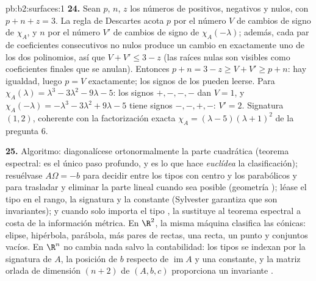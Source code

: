 \begin{solution}{pb:b2:surfaces:1}
\textbf{24.} Sean $p$, $n$, $z$ los números de 
positivos, negativos y nulos, con $p + n + z = 3$. La regla de
Descartes acota $p$ por el número $V$ de cambios de signo de
$\chi_A$, y $n$ por el número $V'$ de cambios de signo de
$\chi_A(-\lambda)$; además, cada par de coeficientes consecutivos no
nulos produce un cambio en exactamente uno de los dos polinomios, así
que $V + V' \leq 3 - z$ (las raíces nulas son visibles como
coeficientes finales que se anulan). Entonces $p + n = 3 - z \geq V +
V' \geq p + n$: hay igualdad, luego $p = V$ exactamente; los signos
de los  pueden leerse. Para $\chi_A(\lambda) =
\lambda^3 - 3\lambda^2 - 9\lambda - 5$: los signos $+,-,-,-$ dan $V =
1$, y $\chi_A(-\lambda) = -\lambda^3 - 3\lambda^2 + 9\lambda - 5$
tiene signos $-,-,+,-$: $V' = 2$. Signatura $(1, 2)$, coherente con
la factorización exacta $\chi_A = (\lambda - 5)(\lambda + 1)^2$ de la
pregunta 6.

\textbf{25.} Algoritmo: diagonalícese ortonormalmente la parte
cuadrática (teorema espectral: es el único paso 
profundo, y es lo que hace \emph{euclídea} la clasificación);
resuélvase $A\Omega = -b$ para decidir entre los tipos con centro y
los parabólicos y para trasladar y eliminar la parte lineal cuando
sea posible (geometría ); léase el tipo en el rango, la
signatura y la constante (Sylvester garantiza que son invariantes);
y cuando solo importa el tipo , la  sustituye
al teorema espectral a costa de la información métrica. En $\R^2$, la
misma máquina clasifica las cónicas: elipse, hipérbola, parábola, más
pares de rectas, una recta, un punto y conjuntos vacíos. En $\R^n$ no
cambia nada salvo la contabilidad: los tipos se indexan por la
signatura de $A$, la posición de $b$ respecto de
$\operatorname{im}A$ y una constante, y la matriz orlada de dimensión
$(n{+}2)$ de $(A, b, c)$ proporciona un invariante .
\end{solution}
